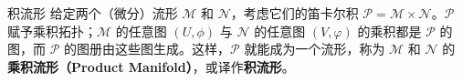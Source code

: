 \begin{definition}{积流形}
给定两个（微分）流形 $\mathcal{M}$ 和 $\mathcal{N}$，考虑它们的笛卡尔积 $\mathcal{P}=\mathcal{M}\times\mathcal{N}$。$\mathcal{P}$ 赋予乘积拓扑；$\mathcal{M}$ 的任意图 $(U, \phi)$ 与 $\mathcal{N}$ 的任意图 $(V, \varphi)$ 的乘积都是 $\mathcal{P}$ 的图，而 $\mathcal{P}$ 的图册由这些图生成。这样，$\mathcal{P}$ 就能成为一个流形，称为 $\mathcal{M}$ 和 $\mathcal{N}$ 的\textbf{乘积流形（Product Manifold）}，或译作\textbf{积流形}。
\end{definition}